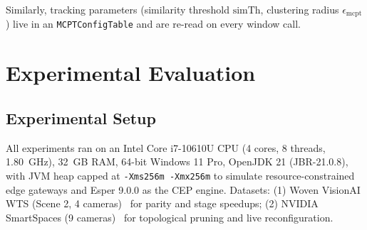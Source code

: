 \documentclass[conference]{IEEEtran}
\begin{document}
Similarly, tracking parameters (similarity threshold $\text{simTh}$, clustering radius $\epsilon_{\text{mcpt}}$) live in an \texttt{MCPTConfigTable} and are re-read on every window call.

\section{Experimental Evaluation}
\label{sec:evaluation}

\subsection{Experimental Setup}
All experiments ran on an Intel Core i7-10610U CPU (4 cores, 8 threads, 1.80~GHz), 32~GB RAM, 64-bit Windows 11 Pro, OpenJDK 21 (JBR-21.0.8), with JVM heap capped at \texttt{-Xms256m -Xmx256m} to simulate resource-constrained edge gateways and Esper 9.0.0 as the CEP engine. Datasets: (1) Woven VisionAI WTS (Scene 2, 4 cameras)~\cite{kong2024wts} for parity and stage speedups; (2) NVIDIA SmartSpaces (9 cameras)~\cite{aicity2025track1} for topological pruning and live reconfiguration.
\end{document}
